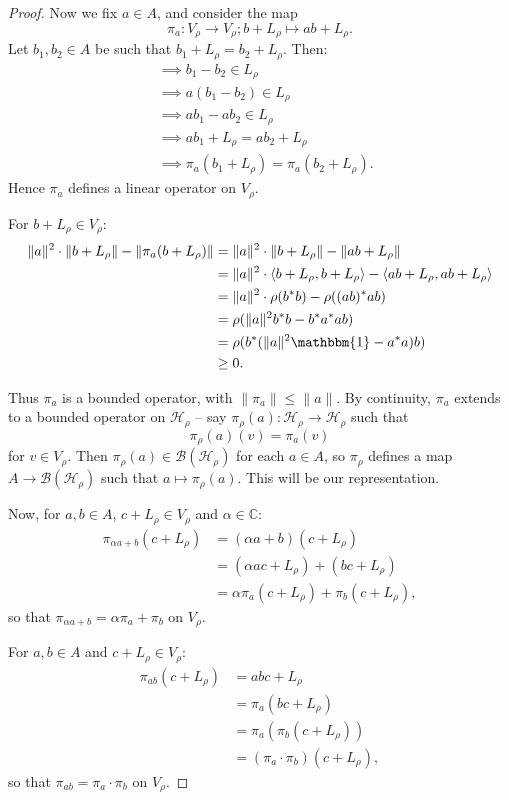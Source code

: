 \documentclass[12pt,a4paper]{amsart}
\theoremstyle{plain}
\theoremstyle{definition}
\newcommand{\B}{\mathcal{B}}
\newcommand{\Hr}{\mathcal{H}_\rho}
\newcommand{\1}{\mathbbm{1}}
\newcommand{\Vr}{V_\rho}
\newcommand{\Lr}{L_\rho}
\begin{document}
\begin{proof}
	Now we fix $a \in A$, and consider the map 
	\[
		\pi_a : V_\rho \to V_\rho; b+L_\rho \mapsto ab+L_\rho.
	\]
	Let $b_1, b_2 \in A$ be such that $b_1+L_\rho = b_2+L_\rho$. Then:
	\begin{align*}
		&\implies	b_1-b_2 \in L_\rho										\\	
		&\implies	a(b_1-b_2) \in L_\rho									\\	
		&\implies	ab_1-ab_2 \in L_\rho									\\	
		&\implies	ab_1 + L_\rho = ab_2+L_\rho								\\	
		&\implies	\pi_a(b_1+L_\rho) = \pi_a(b_2+L_\rho).
	\end{align*}
	Hence $\pi_a$ defines a linear operator on $V_\rho$.
	
	For $b+L_\rho \in V_\rho$:
	\begin{align*}
				\|a\|^2 \cdot \|b+L_\rho\| - \| \pi_a(b+L_\rho) \|
		&=		\|a\|^2 \cdot \|b+L_\rho\| - \| ab+L_\rho \|				\\
		&=		\|a\|^2 \cdot \langle b+L_\rho,b+L_\rho \rangle - 
									\langle ab+L_\rho,ab+L_\rho \rangle		\\
		&=		\|a\|^2 \cdot \rho(b^\ast b) - \rho ((ab)^\ast ab)			\\
		&= 		\rho (\|a\|^2 b^\ast b-b^\ast a^\ast ab)					\\
		&=		\rho (b^\ast (\|a\|^{2} \mathbbm{1} - a ^\ast a)b)			\\
		&\geq 	0.
	\end{align*}
	
	Thus $\pi_a$ is a bounded operator, with $\|\pi_a\| \leq \|a\|$. By continuity,  
	$\pi_a$ extends to a bounded operator on $\Hr$ -- say $\pi_\rho(a):\Hr \to \Hr$ 
	such that \[ \pi_\rho(a)(v) = \pi_a(v) \] for $v\in \Vr$. 
	Then $\pi_\rho(a) \in \B(\Hr)$ for each $a \in A$, so $\pi_\rho$ defines a map 
	$A \to \B(\Hr)$ such that $ a \mapsto \pi_\rho(a)$. This will be our representation.
	
	Now, for $a,b \in A$, $c+ L_\rho \in \Vr$ and $\alpha \in \mathbb{C}$:
	\begin{align*}
				\pi_{\alpha a+b}(c+\Lr)
		&=		(\alpha a+b) (c+\Lr)										\\
		&=		(\alpha ac +\Lr) + (bc+\Lr)									\\
		&=		\alpha \pi_a (c+\Lr) + \pi_b(c+\Lr),
	\end{align*}
	so that $\pi_{\alpha a + b} = \alpha \pi_a +\pi_b$ on $\Vr$.
	
	For $a,b \in A$ and $c+ L_\rho \in \Vr$:
	\begin{align*}
		\pi_{ab}(c+\Lr)
		&=		abc+\Lr														\\
		&=		\pi_a (bc+\Lr)												\\
		&=		\pi_a (\pi_b (c+\Lr))										\\
		&=		(\pi_a \cdot \pi_b) (c+\Lr),
	\end{align*}
	so that $\pi_{a b} = \pi_a \cdot \pi_b$ on $\Vr$.
	

\end{proof}
\end{document}

